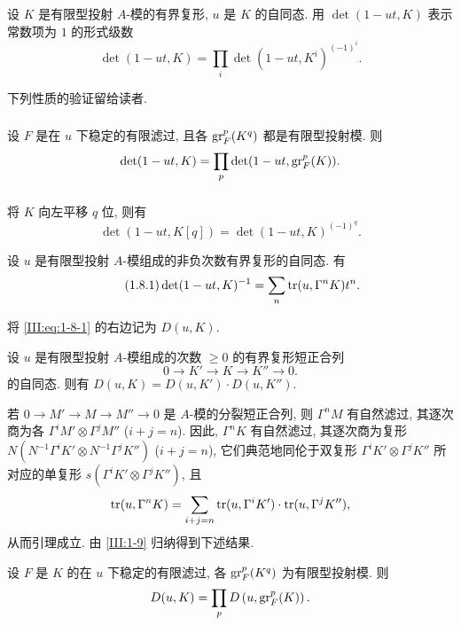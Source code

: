 设 $K$ 是有限型投射 $A$-模的有界复形, $u$ 是 $K$ 的自同态. 用 $\det(1-u t,K)$ 表示常数项为 $1$ 的形式级数
\[
  \det(1-u t,K) = \prod_i \det(1-u t,K^i)^{(-1)^i} \text{.}
\]

下列性质的验证留给读者.

\subsubsection{}\label{III:1-7-1}

设 $F$ 是在 $u$ 下稳定的有限滤过, 且各 $\operatorname{gr}_F^p(K^q)$ 都是有限型投射模. 则
\[
  \det(1-u t,K) = \prod_p \det(1-u t,\operatorname{gr}_F^p(K)) \text{.}
\]

\subsubsection{}\label{III:1-7-2}

将 $K$ 向左平移 $q$ 位, 则有
\[
  \det(1-u t,K[q]) = \det(1-u t,K)^{(-1)^q} \text{.}
\]

\begin{proposition_}\label{III:1-8}
设 $u$ 是有限型投射 $A$-模组成的非负次数有界复形的自同态. 有 \
\begin{equation*}\tag{1.8.1}\label{III:eq:1-8-1}
  \det(1-u t,K)^{-1} = \sum_n \operatorname{tr}(u,\Gamma^n K) t^n \text{.}
\end{equation*}
\end{proposition_}

将 \eqref{III:eq:1-8-1} 的右边记为 $D(u,K)$.

\begin{lemma_}\label{III:1-9}
设 $u$ 是有限型投射 $A$-模组成的次数 $\geqslant 0$ 的有界复形短正合列
\[
  0 \to K' \to K \to K'' \to 0 \text{.}
\]
的自同态. 则有 $D(u,K)=D(u,K')\cdot D(u,K'')$.
\end{lemma_}

若 $0\to M'\to M\to M''\to 0$ 是 $A$-模的分裂短正合列, 则 $\Gamma^n M$ 有自然滤过, 其逐次商为各 $\Gamma^i M'\otimes \Gamma^j M''$ ($i+j=n$). 因此, $\Gamma^n K$ 有自然滤过, 其逐次商为复形 $N(N^{-1} \Gamma^i K'\otimes N^{-1}\Gamma^j K'')$ ($i+j=n$), 它们典范地同伦于双复形 $\Gamma^i K'\otimes \Gamma^j K''$ 所对应的单复形 $s(\Gamma^i K'\otimes \Gamma^j K'')$, 且
\[
  \operatorname{tr}(u,\Gamma^n K) = \sum_{i+j=n} \operatorname{tr}(u,\Gamma^i K')\cdot \operatorname{tr}(u,\Gamma^j K'') \text{,}
\]
从而引理成立. 由 \ref{III:1-9} 归纳得到下述结果.

\begin{lemma_}\label{III:1-10}
设 $F$ 是 $K$ 的在 $u$ 下稳定的有限滤过, 各 $\operatorname{gr}_F^p(K^q)$ 为有限型投射模. 则
\[
  D(u,K) = \prod_p D\left(u,\operatorname{gr}_F^p(K)\right) \text{.}
\]
\end{lemma_}

